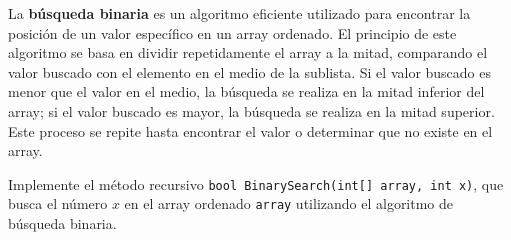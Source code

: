 La \textbf{búsqueda binaria} es un algoritmo eficiente utilizado para encontrar la posición de un valor específico en un array ordenado. El principio de este algoritmo se basa en dividir repetidamente el array a la mitad, comparando el valor buscado con el elemento en el medio de la sublista. Si el valor buscado es menor que el valor en el medio, la búsqueda se realiza en la mitad inferior del array; si el valor buscado es mayor, la búsqueda se realiza en la mitad superior. Este proceso se repite hasta encontrar el valor o determinar que no existe en el array.

Implemente el método recursivo \texttt{bool BinarySearch(int[] array, int x)}, que busca el número \(x\) en el array ordenado \texttt{array} utilizando el algoritmo de búsqueda binaria.
